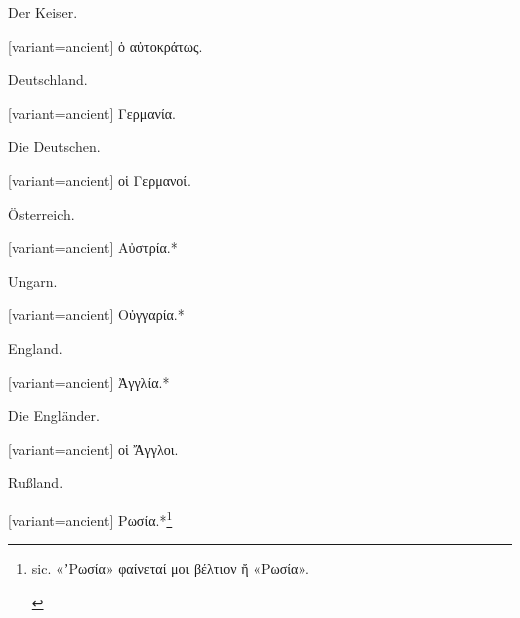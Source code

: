 Der Keiser.

\switchcolumn

\begin{greek}[variant=ancient]%
ὁ αὐτοκράτως.

\end{greek}%
\switchcolumn*

Deutschland.

\switchcolumn

\begin{greek}[variant=ancient]%
Γερμανία.

\end{greek}%
\switchcolumn*

Die Deutschen.

\switchcolumn

\begin{greek}[variant=ancient]%
οἱ Γερμανοί.

\end{greek}%
\switchcolumn*

Österreich.

\switchcolumn

\begin{greek}[variant=ancient]%
Αὐστρία.{*}

\end{greek}%
\switchcolumn*

Ungarn.

\switchcolumn

\begin{greek}[variant=ancient]%
Οὐγγαρία.{*}

\end{greek}%
\switchcolumn*

England.

\switchcolumn

\begin{greek}[variant=ancient]%
Ἀγγλία.{*}

\end{greek}%
\switchcolumn*

Die Engländer.

\switchcolumn

\begin{greek}[variant=ancient]%
οἱ Ἄγγλοι.

\end{greek}%
\switchcolumn*

Rußland.

\switchcolumn

\begin{greek}[variant=ancient]%
Ρωσία.{*}\footnote{\begin{latin}%
sic.\textgreek[variant=ancient]{ «ʼΡωσία» φαίνεταί μοι βέλτιον ἤ «Ρωσία».}\end{latin}%
}

\end{greek}%
\switchcolumn*

